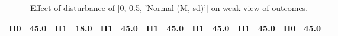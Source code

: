 \begin{table}
\begin{tabular}{l|cc|cc|cc|cc|cc|cc|cc}
\cellcolor{Bittersweet}H0&\cellcolor{Bittersweet}45.0&\cellcolor{Bittersweet}H1&\cellcolor{Bittersweet}18.0&\cellcolor{Bittersweet}H1&\cellcolor{Bittersweet}45.0&\cellcolor{Bittersweet}H1&\cellcolor{Bittersweet}45.0&\cellcolor{Bittersweet}H1&\cellcolor{Bittersweet}45.0&\cellcolor{Bittersweet}H1&\cellcolor{Bittersweet}45.0&\cellcolor{Bittersweet}H0&\cellcolor{Bittersweet}45.0\\\bottomrule\end{tabular}\caption{Effect of disturbance of [0, 0.5, 'Normal (M, sd)'] on weak view of outcomes.}\end{table}